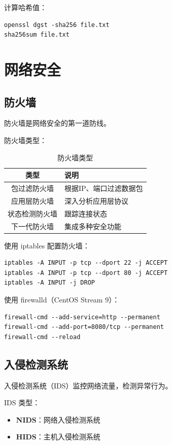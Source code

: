 \documentclass[12pt,UTF8]{ctexbook}
\begin{document}
计算哈希值：
\begin{verbatim}
openssl dgst -sha256 file.txt
sha256sum file.txt
\end{verbatim}

\chapter{网络安全}
\label{chap:network_security}

\section{防火墙}
\label{sec:firewall}

防火墙是网络安全的第一道防线。

防火墙类型：
\begin{table}[htbp]
    \centering
    \caption{防火墙类型}
    \begin{tabular}{|c|p{8cm}|}
        \hline
        \textbf{类型} & \textbf{说明} \\
        \hline
        包过滤防火墙 & 根据IP、端口过滤数据包 \\
        \hline
        应用层防火墙 & 深入分析应用层协议 \\
        \hline
        状态检测防火墙 & 跟踪连接状态 \\
        \hline
        下一代防火墙 & 集成多种安全功能 \\
        \hline
    \end{tabular}
\end{table}

使用 iptables 配置防火墙：
\begin{verbatim}
iptables -A INPUT -p tcp --dport 22 -j ACCEPT
iptables -A INPUT -p tcp --dport 80 -j ACCEPT
iptables -A INPUT -j DROP
\end{verbatim}

使用 firewalld（CentOS Stream 9）：
\begin{verbatim}
firewall-cmd --add-service=http --permanent
firewall-cmd --add-port=8080/tcp --permanent
firewall-cmd --reload
\end{verbatim}

\section{入侵检测系统}
\label{sec:ids}

入侵检测系统（IDS）监控网络流量，检测异常行为。

IDS 类型：
\begin{itemize}
    \item \textbf{NIDS}：网络入侵检测系统
    \item \textbf{HIDS}：主机入侵检测系统
\end{itemize}
\end{document}
